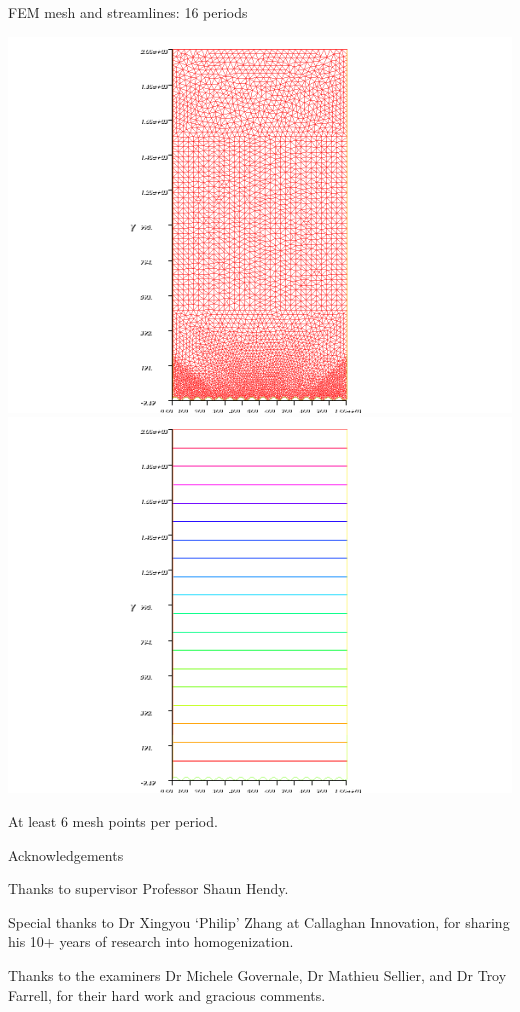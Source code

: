 \documentclass{beamer}
\begin{document}
\begin{frame}{FEM mesh and streamlines: 16 periods}

\begin{center}
\includegraphics[scale=0.4, trim=4cm 0cm 4cm 0cm, clip=true]{FEM_mesh_16.png}
\includegraphics[scale=0.4, trim=4cm 0cm 4cm 0cm, clip=true]{FEM_streamlines_16.png}
\end{center}
At least 6 mesh points per period.
\end{frame}


\begin{frame}{Acknowledgements}

Thanks to supervisor Professor Shaun Hendy.

\vspace{1em}
Special thanks to Dr Xingyou `Philip' Zhang at Callaghan Innovation,
for sharing his 10+ years of research into homogenization.

\vspace{1em}
Thanks to the examiners Dr Michele Governale, Dr Mathieu Sellier, and Dr Troy Farrell, for their hard work and gracious comments.

\end{frame}
\end{document}
